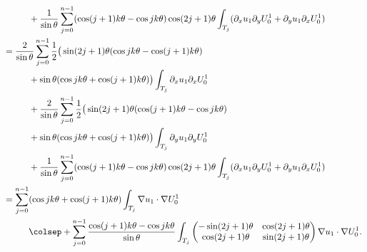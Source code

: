 \begin{align*}
&\hspace*{1cm}+\frac{1}{\sin \theta}\sum_{j=0}^{n-1} (\cos(j+1)k\theta-\cos jk\theta)\cos(2j+1)\theta
\int_{T_j} (\partial_x u_1 \partial_y U_0^1 + \partial_y u_1 \partial_x U_0^1)
\\
&=\frac{2}{\sin \theta} \sum_{j=0}^{n-1}
\frac{1}{2} \big(\sin(2j+1)\theta (\cos jk\theta-\cos(j+1)k\theta)\\
&\hspace*{1cm}+\sin\theta (\cos jk\theta+\cos (j+1)k\theta) \big) \int_{T_j} \partial_x u_1 \partial_x U_0^1
\\
&\hspace*{1cm}+\frac{2}{\sin \theta} \sum_{j=0}^{n-1}
\frac{1}{2} \big(\sin(2j+1)\theta (\cos (j+1)k\theta-\cos j k\theta)\\
&\hspace*{1cm}+\sin\theta (\cos jk\theta+\cos (j+1)k\theta)
\big)
\int_{T_j} \partial_y u_1 \partial_y U_0^1
\\
&\hspace*{1cm}+\frac{1}{\sin \theta}\sum_{j=0}^{n-1} (\cos(j+1)k\theta-\cos jk\theta)\cos(2j+1)\theta
\int_{T_j} (\partial_x u_1 \partial_y U_0^1 + \partial_y u_1 \partial_x U_0^1)
\\
&= \sum_{j=0}^{n-1} (\cos jk\theta+\cos (j+1)k\theta) \int_{T_j}\nabla u_1 \cdot \nabla U_0^1
\\
&\hspace*{1cm}\colsep+ \sum_{j=0}^{n-1} \frac{\cos(j+1)k\theta-\cos jk\theta}{\sin \theta} \int_{T_j}\begin{pmatrix}
-\sin (2j+1)\theta & \cos (2j+1) \theta \\
\cos(2j+1)\theta & \sin (2j+1)\theta
\end{pmatrix}\nabla u_1 \cdot \nabla U_0^1.
\end{align*}
\egroup\newpage

